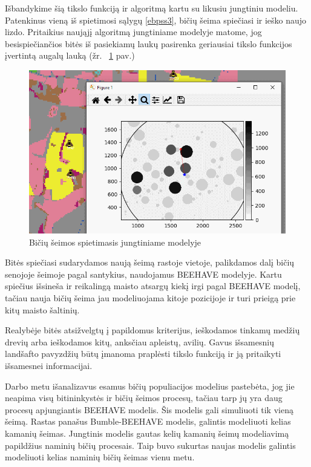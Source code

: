 \documentclass{VUMIFKompMagistrinis}
\begin{document}
Išbandykime šią tikslo funkciją ir algoritmą kartu su likusiu jungtiniu modeliu. Patenkinus vieną iš spietimosi sąlygų \eqref{ebpss3}, bičių šeima spiečiasi ir ieško naujo lizdo.  Pritaikius naująjį algoritmą jungtiniame modelyje matome, jog besispiečiančios bitės iš pasiekiamų laukų pasirenka geriausiai tikslo funkcijos įvertintą augalų lauką (žr. ~\ref{img:fin1} pav.)

\begin{figure}[H]
    \centering
    \includegraphics[scale=0.75]{img/new/mags.png}
     \caption{Bičių šeimos spietimasis jungtiniame modelyje}
    \label{img:fin1}
\end{figure}

Bitės spiečiasi sudarydamos naują šeimą rastoje vietoje, palikdamos dalį bičių senojoje šeimoje pagal santykius, naudojamus BEEHAVE modelyje. Kartu spiečius išsineša ir reikalingą maisto atsargų kiekį irgi pagal BEEHAVE modelį, tačiau nauja bičių šeima jau modeliuojama kitoje pozicijoje ir turi prieigą prie kitų maisto šaltinių.

Realybėje bitės atsižvelgtų į papildomus kriterijus, ieškodamos tinkamų medžių drevių arba ieškodamos kitų, anksčiau apleistų, avilių. Gavus išsamesnių landšafto pavyzdžių būtų įmanoma praplėsti tikslo funkciją ir ją pritaikyti išsamesnei informacijai. 




Darbo metu išanalizavus  esamus bičių populiacijos modelius pastebėta, jog jie neapima visų bitininkystės ir bičių šeimos procesų, tačiau tarp jų yra daug procesų apjungiantis BEEHAVE modelis. Šis modelis gali simuliuoti tik vieną šeimą. Rastas panašus Bumble-BEEHAVE modelis, galintis modeliuoti kelias kamanių šeimas. Jungtinis modelis gautas kelių kamanių šeimų modeliavimą papildžius naminių bičių procesais. Taip buvo sukurtas naujas modelis galintis modeliuoti kelias naminių bičių šeimas vienu metu.
\end{document}
